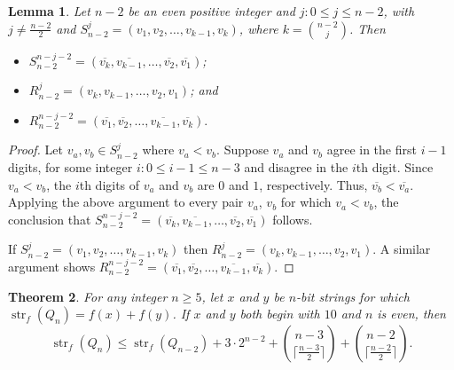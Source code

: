 \documentclass[12pt]{article}
\newtheorem{theorem}{Theorem}[section]
\newtheorem{lemma}[theorem]{Lemma}
\DeclareMathOperator{\str}{str}
\begin{document}
\begin{lemma}\label{lemma0.1} Let $n-2$ be an even positive integer and $j: 0\leq j \leq n-2$, with $j \neq \frac{n-2}{2}$ and $S_{n-2}^j = (v_1,v_2,\dots,v_{k-1},v_k)$, where $k = \binom{n-2}{j}$. Then \begin{itemize}
\item $S_{n-2}^{n-j-2} = (\overline{v_k},\overline{v_{k-1}},\dots,\overline{v_2},\overline{v_1})$;
\item $R_{n-2}^j = (v_k,v_{k-1},\dots,v_2,v_1)$; and 
\item $R_{n-2}^{n-j-2}=(\overline{v_1},\overline{v_2},\dots,\overline{v_{k-1}},\overline{v_k}).$\end{itemize}\end{lemma}

\begin{proof} 
Let $v_a,v_b \in S_{n-2}^j$ where $v_a < v_b$. Suppose $v_a$ and $v_b$ agree in the first $i-1$ digits, for some integer $i: 0 \leq i-1 \leq n-3$ and disagree in the $i$th digit. Since $v_a < v_b$, the $i$th digits of $v_a$ and $v_b$ are $0$ and $1$, respectively. Thus, $\overline{v_b} < \overline{v_a}$.  Applying the above argument to every pair $v_a$, $v_b$ for which $v_a < v_b$, the conclusion that $S_{n-2}^{n-j-2} = (\overline{v_k},\overline{v_{k-1}},\dots,\overline{v_2},\overline{v_1})$ follows.

If $S_{n-2}^j = (v_1,v_2,\dots,v_{k-1},v_k)$ then $R_{n-2}^j = (v_k,v_{k-1},\dots,v_2,v_1)$.  A similar argument shows $R_{n-2}^{n-j-2} = (\overline{v_1},\overline{v_2},\dots,\overline{v_{k-1}},\overline{v_k})$. \end{proof} 


\begin{theorem}\label{thm:both10even} For any integer $n \geq 5$, let $x$ and $y$ be $n$-bit strings for which $\str_f(Q_{n}) = f(x)+f(y)$.  If $x$ and $y$ both begin with $10$ and $n$ is even, then $$\str_f(Q_{n}) \leq \str_f(Q_{n-2}) + 3 \cdot 2^{n-2} + \binom{n-3}{\lceil \frac{n-3}{2}\rceil}+\binom{n-2}{\lceil \frac{n-2}{2}\rceil}.$$ \end{theorem} 
\end{document}
